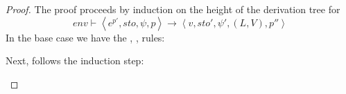 \documentclass[../../../master.tex]{subfiles}
\begin{document}
\begin{proof}
	The proof proceeds by induction on the height of the derivation tree for 
	$$env\vdash\left\langle e^{p'},sto,\psi,p\right\rangle\rightarrow\left\langle v,sto',\psi',(L,V),p''\right\rangle$$
	In the base case we have the , ,  rules:
	\begin{description}
		
		
		
	\end{description}

	Next, follows the induction step:
	\begin{description}
		
		
		
		
		
		
		
		
		
	\end{description}
\end{proof}
\end{document}
